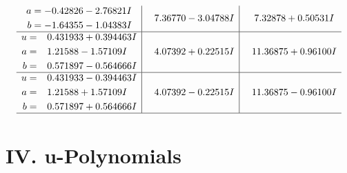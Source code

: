 \documentclass[1p]{elsarticle_modified}
\theoremstyle{definition}
\begin{document}
$$\begin{array}{c|c|c}
\begin{aligned}
a &= -0.42826 - 2.76821 I \\
b &= -1.64355 - 1.04383 I\end{aligned}
 & \phantom{-}7.36770 - 3.04788 I & \phantom{-}7.32878 + 0.50531 I \\ \hline\begin{aligned}
u &= \phantom{-}0.431933 + 0.394463 I \\
a &= \phantom{-}1.21588 - 1.57109 I \\
b &= \phantom{-}0.571897 - 0.564666 I\end{aligned}
 & \phantom{-}4.07392 + 0.22515 I & \phantom{-}11.36875 + 0.96100 I \\ \hline\begin{aligned}
u &= \phantom{-}0.431933 - 0.394463 I \\
a &= \phantom{-}1.21588 + 1.57109 I \\
b &= \phantom{-}0.571897 + 0.564666 I\end{aligned}
 & \phantom{-}4.07392 - 0.22515 I & \phantom{-}11.36875 - 0.96100 I\\
 \hline 
 \end{array}$$\newpage
\newpage\renewcommand{\arraystretch}{1}
\centering \section*{ IV. u-Polynomials}
\end{document}
